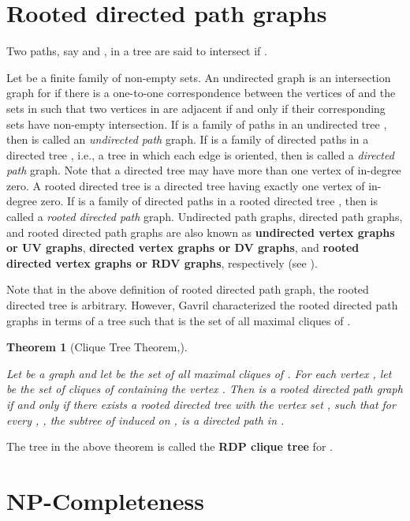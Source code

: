 \documentclass[a4paper,12pt]{article}
\theoremstyle{plain}
\newtheorem{theorem}{Theorem}[section]
\theoremstyle{definition}
\theoremstyle{remark}
\begin{document}
\section{Rooted directed path graphs}

Two paths, say  and , in a tree  are said to intersect
if .

Let  be a finite family of non-empty sets. An
undirected graph  is an intersection graph for  if
there is a one-to-one correspondence between the vertices of  and
the sets in  such that two vertices in  are adjacent
 if and only if their corresponding sets have non-empty intersection.
 If  is a family of paths in an undirected tree ,
then  is called an {\it undirected path} graph. If 
is a family of directed paths in a directed tree , i.e., a tree
in which each edge is oriented, then  is called a {\it directed
path} graph. Note that a directed tree may have more than one vertex
of in-degree zero. A rooted directed tree is a directed tree having
exactly one vertex of in-degree zero. If  is a family
of directed paths in a rooted directed tree , then  is called
a {\it rooted directed path} graph. Undirected path graphs, directed
path graphs, and rooted directed path graphs are also known as {\bf
undirected vertex graphs or UV graphs}, {\bf directed vertex graphs
or DV graphs}, and {\bf rooted directed vertex graphs or RDV
graphs}, respectively (see \cite{monma}).



Note that in the above definition of rooted directed path graph, the
rooted directed tree  is arbitrary. However, Gavril \cite{gav}
characterized the rooted directed path graphs  in terms of a tree
 such that  is the set of all maximal cliques of .

\begin{theorem}[Clique Tree Theorem,\cite{gav,monma}]\label{ctt}

Let  be a graph and let  be the set of all
maximal cliques of . For each vertex , let
 be the set of cliques of  containing
the vertex . Then  is a rooted directed path graph if and only
if there exists a rooted directed tree  with the vertex set
, such that for every , , the
subtree of  induced on , is a directed path in
.



\end{theorem}
The tree  in the above theorem is called the {\bf RDP clique
tree} for .

\section{NP-Completeness }
\end{document}
